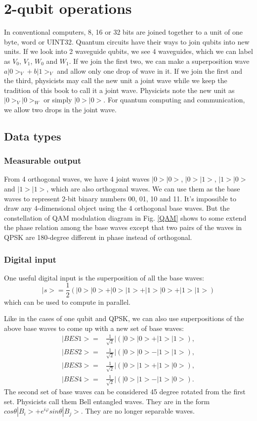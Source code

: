 \documentclass{book}
\begin{document}
\chapter{2-qubit operations}
In conventional computers, 8, 16 or 32 bits are joined together to a unit of one byte, word or UINT32. Quantum circuits have their ways to join qubits into new units. If we look into 2 waveguide qubits, we see 4 waveguides, which we can label as $V_0$, $V_1$, $W_0$ and $W_1$. If we join the first two, we can make a superposition wave $a|0>_V+b|1>_V$ and allow only one drop of wave in it. If we join the first and the third, physicists may call the new unit a joint wave while we keep the tradition of this book to call it a joint wave. Physicists note the new unit as $|0>_V |0>_W$ or simply $|0>|0>$. For quantum computing and communication, we allow two drops in the joint wave.

\section{Data types}
\subsection{Measurable output}
From 4 orthogonal waves, we have 4 joint waves $|0>|0>$, $|0>|1>$, $|1>|0>$ and $|1>|1>$, which are also orthogonal waves. We can use them as the base waves to represent 2-bit binary numbers 00, 01, 10 and 11. It's impossible to draw any 4-dimensional object using the 4 orthogonal base waves. But the constellation of QAM modulation diagram in Fig. \ref{QAM} shows to some extend the phase relation among the base waves except that two pairs of the waves in QPSK are 180-degree different in phase instead of orthogonal.

\subsection{Digital input}
One useful digital input is the superposition of all the base waves:
\begin{equation}
    |s> = \frac 1 2 (|0>|0>+|0>|1>+|1>|0>+|1>|1>)
\end{equation}
which can be used to compute in parallel.

Like in the cases of one qubit and QPSK, we can also use superpositions of the above base waves to come up with a new set of base waves:
\begin{equation}
\begin{array}{rl}
    |BES1> =& \frac 1 {\sqrt 2}| (|0>|0>+|1>|1>),\\
    |BES2> =& \frac 1 {\sqrt 2}| (|0>|0>-|1>|1>),\\
    |BES3> =& \frac 1 {\sqrt 2}| (|0>|1>+|1>|0>),\\
    |BES4> =& \frac 1 {\sqrt 2}| (|0>|1>-|1>|0>).
\end{array}
\end{equation}
The second set of base waves can be considered 45 degree rotated from the first set. Physicists call them Bell entangled waves. They are in the form $cos\theta |B_i> + e^{i \varphi} sin\theta |B_j>$. They are no longer separable waves.
\end{document}
